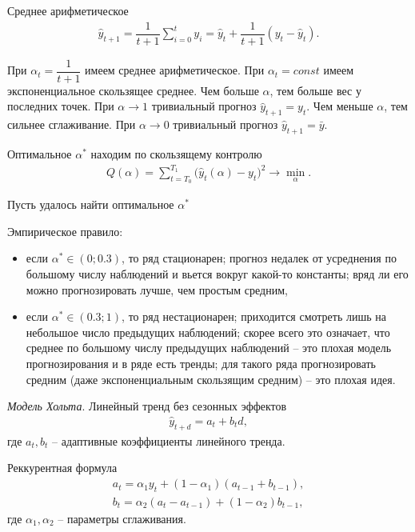 \documentclass[%
	11pt,
	a4paper,
	utf8,
		]{article}
\begin{document}
Среднее арифметическое 
\begin{align*}
	\hat{y}_{t + 1} = \dfrac{1}{t + 1} \sum_{i=0}^{t} y_i = \hat{y}_t + \dfrac{1}{t + 1} (y_t - \hat{y}_t).
\end{align*}

При $ \alpha_t = \dfrac{1}{t + 1} $ имеем среднее арифметическое. При $ \alpha_t = const $ имеем экспоненциальное скользящее среднее. Чем больше $ \alpha $, тем больше вес у последних точек. При $ \alpha \to 1 $ тривиальный прогноз $ \hat{y}_{t + 1} = y_t $. Чем меньше $ \alpha $, тем сильнее сглаживание. При $ \alpha \to 0 $ тривиальный прогноз $ \hat{y}_{t + 1} = \bar{y} $.

Оптимальное $ \alpha^* $ находим по скользящему контролю
\begin{align*}
	Q(\alpha) = \sum_{t = T_0}^{T_1} \big( \hat{y}_t(\alpha) - y_t \big)^2 \to \min_{\alpha}.
\end{align*}

Пусть удалось найти оптимальное $ \alpha^* $

Эмпирическое правило:
\begin{itemize}
	\item если $ \alpha^* \in (0; 0.3)$, то ряд стационарен; прогноз недалек от усреднения по большому числу наблюдений и вьется вокруг какой-то константы; вряд ли его можно прогнозировать лучше, чем простым средним,
	
	\item если $ \alpha^* \in (0.3; 1) $, то ряд нестационарен; приходится смотреть лишь на небольшое число предыдущих наблюдений; скорее всего это означает, что среднее по большому числу предыдущих наблюдений -- это плохая модель прогнозирования и в ряде есть тренды; для такого ряда прогнозировать средним (даже экспоненциальным скользящим средним) -- это плохая идея.
\end{itemize}

\emph{Модель Хольта}. Линейный тренд без сезонных эффектов
\begin{align*}
	\hat{y}_{t + d} = a_t + b_t d,
\end{align*}
где $ a_t, b_t $ -- адаптивные коэффициенты линейного тренда.

Реккурентная формула
\begin{align*}
	a_t = \alpha_1 y_t + (1 - \alpha_1)(a_{t - 1} + b_{t - 1}),\\
	b_t = \alpha_2 (a_t - a_{t - 1}) + (1 - \alpha_2) b_{t - 1},
\end{align*}
где $ \alpha_1, \alpha_2 $ -- параметры сглаживания.
\end{document}

